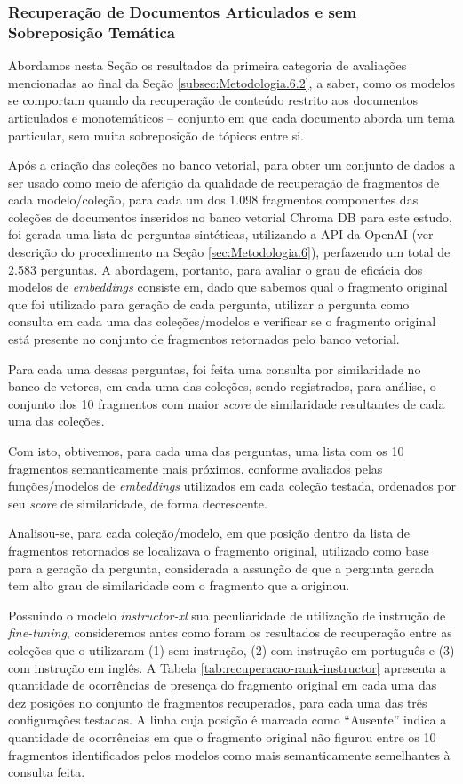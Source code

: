 \subsubsection{Recuperação de Documentos Articulados e sem Sobreposição Temática}
\label{subsubsec:Resultados.2.1.3}

Abordamos nesta Seção os resultados da primeira categoria de avaliações mencionadas ao final da Seção \ref{subsec:Metodologia.6.2}, a saber, como os modelos se comportam quando da recuperação de conteúdo restrito aos documentos articulados e monotemáticos -- conjunto em que cada documento aborda um tema particular, sem muita sobreposição de tópicos entre si.

Após a criação das coleções no banco vetorial, para obter um conjunto de dados a ser usado como meio de aferição da qualidade de recuperação de fragmentos de cada modelo/coleção, para cada um dos 1.098 fragmentos componentes das coleções de documentos inseridos no banco vetorial Chroma DB para este estudo, foi gerada uma lista de perguntas sintéticas, utilizando a API da OpenAI (ver descrição do procedimento na Seção \ref{sec:Metodologia.6}), perfazendo um total de 2.583 perguntas. A abordagem, portanto, para avaliar o grau de eficácia dos modelos de \textit{embeddings} consiste em, dado que sabemos qual o fragmento original que foi utilizado para geração de cada pergunta, utilizar a pergunta como consulta em cada uma das coleções/modelos e verificar se o fragmento original está presente no conjunto de fragmentos retornados pelo banco vetorial.

Para cada uma dessas perguntas, foi feita uma consulta por similaridade no banco de vetores, em cada uma das coleções, sendo registrados, para análise, o conjunto dos 10 fragmentos com maior \textit{score} de similaridade resultantes de cada uma das coleções.

Com isto, obtivemos, para cada uma das perguntas, uma lista com os 10 fragmentos semanticamente mais próximos, conforme avaliados pelas funções/modelos de \textit{embeddings} utilizados em cada coleção testada, ordenados por seu \textit{score} de similaridade, de forma decrescente. 

Analisou-se, para cada coleção/modelo, em que posição dentro da lista de fragmentos retornados se localizava o fragmento original, utilizado como base para a geração da pergunta, considerada a assunção de que a pergunta gerada tem alto grau de similaridade com o fragmento que a originou.

Possuindo o modelo \textit{instructor-xl} sua peculiaridade de utilização de instrução de \textit{fine-tuning}, consideremos antes como foram os resultados de recuperação entre as coleções que o utilizaram (1) sem instrução, (2) com instrução em português e (3) com instrução em inglês. A Tabela \ref{tab:recuperacao-rank-instructor} apresenta a quantidade de ocorrências de presença do fragmento original em cada uma das dez posições no conjunto de fragmentos recuperados, para cada uma das três configurações testadas. A linha cuja posição é marcada como ``Ausente'' indica a quantidade de ocorrências em que o fragmento original não figurou entre os 10 fragmentos identificados pelos modelos como mais semanticamente semelhantes à consulta feita.

